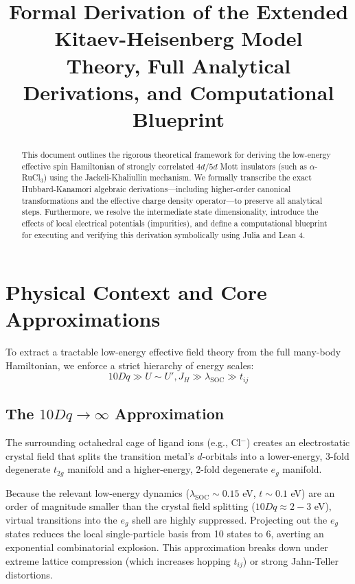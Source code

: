 \documentclass[11pt, a4paper]{article}
\title{\textbf{Formal Derivation of the Extended Kitaev-Heisenberg Model}\\ \large Theory, Full Analytical Derivations, and Computational Blueprint}
\author{}
\date{}
\begin{document}
\maketitle

\begin{abstract}
This document outlines the rigorous theoretical framework for deriving the low-energy effective spin Hamiltonian of strongly correlated $4d/5d$ Mott insulators (such as $\alpha$-RuCl$_3$) using the Jackeli-Khaliullin mechanism. We formally transcribe the exact Hubbard-Kanamori algebraic derivations---including higher-order canonical transformations and the effective charge density operator---to preserve all analytical steps. Furthermore, we resolve the intermediate state dimensionality, introduce the effects of local electrical potentials (impurities), and define a computational blueprint for executing and verifying this derivation symbolically using Julia and Lean 4.
\end{abstract}

\tableofcontents
\vspace{1cm}

\section{Physical Context and Core Approximations}

To extract a tractable low-energy effective field theory from the full many-body Hamiltonian, we enforce a strict hierarchy of energy scales:
\begin{equation}
10Dq \gg U \sim U', J_H \gg \lambda_{\text{SOC}} \gg t_{ij}
\end{equation}

\subsection{The $10Dq \to \infty$ Approximation}
The surrounding octahedral cage of ligand ions (e.g., Cl$^-$) creates an electrostatic crystal field that splits the transition metal's $d$-orbitals into a lower-energy, 3-fold degenerate $t_{2g}$ manifold and a higher-energy, 2-fold degenerate $e_g$ manifold. 

Because the relevant low-energy dynamics ($\lambda_{\text{SOC}} \sim 0.15$ eV, $t \sim 0.1$ eV) are an order of magnitude smaller than the crystal field splitting ($10Dq \approx 2-3$ eV), virtual transitions into the $e_g$ shell are highly suppressed. Projecting out the $e_g$ states reduces the local single-particle basis from 10 states to 6, averting an exponential combinatorial explosion. This approximation breaks down under extreme lattice compression (which increases hopping $t_{ij}$) or strong Jahn-Teller distortions.
\end{document}
